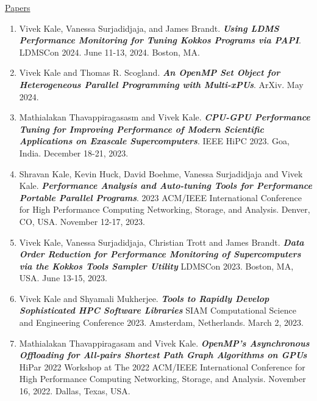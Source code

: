 




\underline{Papers}
\begin{enumerate} 
\item Vivek Kale, Vanessa Surjadidjaja, and James Brandt. \textbf{\textit{Using LDMS Performance Monitoring for Tuning Kokkos Programs via PAPI}}. LDMSCon 2024. June 11-13, 2024. Boston, MA.

\item Vivek Kale and Thomas R. Scogland. \textbf{\textit{An OpenMP Set Object for Heterogeneous Parallel Programming with Multi-xPUs}}. ArXiv. May 2024. 
\item Mathialakan Thavappiragasasm and Vivek Kale. \textbf{\textit{CPU-GPU Performance Tuning for Improving Performance of Modern Scientific Applications on Exascale Supercomputers}}. IEEE HiPC 2023. Goa, India. December 18-21, 2023.
\item Shravan Kale, Kevin Huck, David Boehme, Vanessa Surjadidjaja and Vivek Kale. \textbf{\textit{Performance Analysis and Auto-tuning Tools for Performance Portable Parallel Programs}}. 2023 ACM/IEEE International Conference for High Performance Computing Networking, Storage, and Analysis. Denver, CO, USA. November 12-17, 2023.

\item Vivek Kale, Vanessa Surjadidjaja, Christian Trott and James Brandt. \textbf{\textit{Data Order Reduction for Performance Monitoring of Supercomputers via the Kokkos Tools Sampler Utility}} LDMSCon 2023. Boston, MA, USA. June 13-15, 2023. 

\item Vivek Kale and Shyamali Mukherjee. \textbf{\textit{Tools to Rapidly Develop Sophisticated HPC Software Libraries}} SIAM Computational Science and Engineering Conference 2023. Amsterdam, Netherlands. March 2, 2023.

\item Mathialakan Thavappiragasam and Vivek Kale. \textbf{\textit{OpenMP’s Asynchronous Offloading for All-pairs Shortest Path Graph Algorithms on GPUs}}  HiPar 2022 Workshop at The 2022 ACM/IEEE International Conference for High Performance Computing Networking, Storage, and Analysis. November 16, 2022. Dallas, Texas, USA. 


\end{enumerate}

